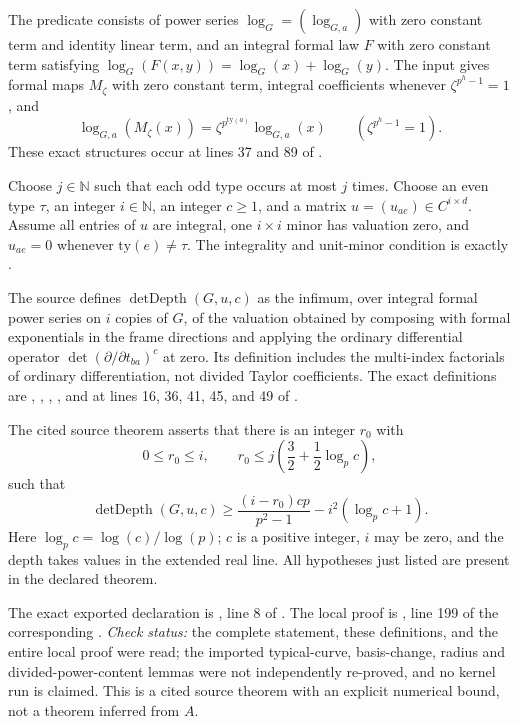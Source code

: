 \documentclass[11pt,a4paper]{article}
\theoremstyle{definition}
\begin{document}
The predicate  consists of power series
\(\log_G=(\log_{G,a})\) with zero constant term and identity linear term,
and an integral formal law \(F\) with zero constant term satisfying
\(\log_G(F(x,y))=\log_G(x)+\log_G(y)\).
The input  gives formal maps \(M_\zeta\) with
zero constant term, integral coefficients whenever
\(\zeta^{p^h-1}=1\), and
\[
 \log_{G,a}(M_\zeta(x))
 =\zeta^{p^{\mathrm{ty}(a)}}\log_{G,a}(x)
 \qquad(\zeta^{p^h-1}=1).
\]
These exact structures occur at lines 37 and 89 of
.

Choose \(j\in\mathbb N\) such that each odd type occurs at most \(j\)
times.  Choose an even type \(\tau\), an integer \(i\in\mathbb N\),
an integer \(c\geq1\), and a matrix \(u=(u_{ae})\in C^{i\times d}\).
Assume all entries of \(u\) are integral, one \(i\times i\) minor has
valuation zero, and \(u_{ae}=0\) whenever \(\mathrm{ty}(e)\ne\tau\).
The integrality and unit-minor condition is exactly
.

The source defines \(\operatorname{detDepth}(G,u,c)\) as the infimum,
over integral formal power series on \(i\) copies of \(G\), of the
valuation obtained by composing with formal exponentials in the frame
directions and applying the ordinary differential operator
\(\det(\partial/\partial t_{ba})^c\) at zero.  Its definition includes
the multi-index factorials of ordinary differentiation, not divided Taylor
coefficients.  The exact definitions are ,
, , , and
 at lines 16, 36, 41, 45, and 49 of
.

The cited source theorem asserts that there is an integer \(r_0\) with
\[
 0\leq r_0\leq i,
 \qquad
 r_0\leq j\left(\frac32+\frac12\log_p c\right),
\]
such that
\[
 \boxed{
 \operatorname{detDepth}(G,u,c)
 \geq
 \frac{(i-r_0)c p}{p^2-1}
 -i^2(\log_p c+1).}
\]
Here \(\log_p c=\log(c)/\log(p)\); \(c\) is a positive integer,
\(i\) may be zero, and the depth takes values in the extended real line.
All hypotheses just listed are present in the declared theorem.

The exact exported declaration is
,
line 8 of
.
The local proof is
, line 199 of the corresponding
.
\emph{Check status:} the complete statement, these definitions, and the
entire local proof were read; the imported typical-curve, basis-change,
radius and divided-power-content lemmas were not independently re-proved,
and no kernel run is claimed.  This is a cited source theorem with an
explicit numerical bound, not a theorem inferred from \(A\).
\end{document}
